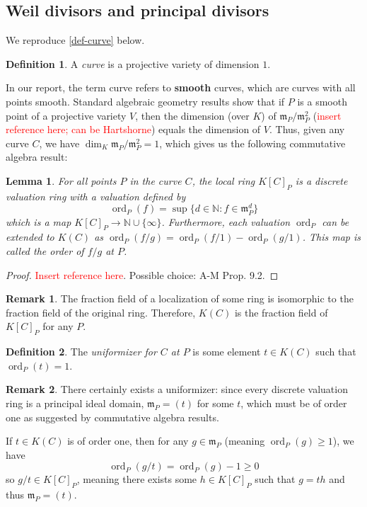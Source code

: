 \documentclass[12pt]{article}
\newtheorem{lemma}{Lemma}[subsection]
\theoremstyle{remark}
\theoremstyle{definition}
\newtheorem{remark}{Remark}[subsection]
\newtheorem{definition}{Definition}[subsection]
\newcommand{\ord}[0]{\operatorname{ord}}
\newcommand{\N}[0]{\mathbb{N}}
\begin{document}
    \subsection{Weil divisors and principal divisors}
        We reproduce \autoref{def-curve} below.
        \begin{definition}
            A \textit{curve} is a projective variety of dimension $1$.
        \end{definition}
        In our report, the term curve refers to \textbf{smooth} curves, which are curves with all points smooth. Standard algebraic geometry results show that if $P$ is a smooth point of a projective variety $V$, then the dimension (over $K$) of $\mathfrak m_P/\mathfrak m_P^2$ (\textcolor{red}{insert reference here; can be Hartshorne}) equals the dimension of $V$. Thus, given any curve $C$, we have $\dim_K \mathfrak m_P/\mathfrak m_P^2=1$, which gives us the following commutative algebra result:
        \begin{lemma}\label{lemma-ord}
            For all points $P$ in the curve $C$, the local ring $K[C]_P$ is a discrete valuation ring with a valuation defined by
            \[\ord_P(f)=\sup\{d\in\N:f\in\mathfrak m_P^d\}\]
            which is a map $K[C]_P\to\N\cup\{\infty\}$. Furthermore, each valuation $\ord_P$ can be extended to $K(C)$ as $\ord_P(f/g)=\ord_P(f/1)-\ord_P(g/1)$. This map is called \textup{the order of $f/g$ at $P$}.
        \end{lemma}
        \begin{proof}
            \textcolor{red}{Insert reference here}. Possible choice: A-M Prop. 9.2.
        \end{proof}
        \begin{remark}
            The fraction field of a localization of some ring is isomorphic to the fraction field of the original ring. Therefore, $K(C)$ is the fraction field of $K[C]_P$ for any $P$.
        \end{remark}
        \begin{definition}
            The \textit{uniformizer for $C$ at $P$} is some element $t\in K(C)$ such that $\ord_P(t)=1$.
        \end{definition}
        \begin{remark}
            There certainly exists a uniformizer: since every discrete valuation ring is a principal ideal domain, $\mathfrak m_P=(t)$ for some $t$, which must be of order one as suggested by commutative algebra results.

            If $t\in K(C)$ is of order one, then for any $g\in\mathfrak m_P$ (meaning $\ord_P(g)\geqslant 1$), we have
            \[\ord_P(g/t)=\ord_P (g)-1\geqslant 0\]
            so $g/t\in K[C]_P$, meaning there exists some $h\in K[C]_P$ such that $g=th$ and thus $\mathfrak m_P=(t)$.
        \end{remark}
\end{document}
